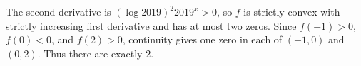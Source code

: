 The second derivative is $(\log2019)^2 2019^x>0$, so $f$ is strictly convex with strictly increasing first derivative and has at most two zeros. Since $f(-1)>0$, $f(0)<0$, and $f(2)>0$, continuity gives one zero in each of $(-1,0)$ and $(0,2)$. Thus there are exactly $\boxed2$.
